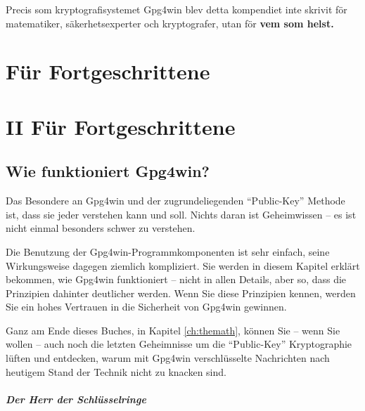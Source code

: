 \documentclass[a4paper,11pt, oneside,openright,titlepage,dvips]{scrbook}
\newcounter{part}
\newcounter{chapter}
\newcounter{section}[chapter]
\begin{document}
Precis som kryptografisystemet Gpg4win blev detta kompendiet inte 
skrivit för matematiker, säkerhetsexperter och kryptografer, utan 
för \textbf{vem som helst.}









\clearpage
{}
\T\part{Für Fortgeschrittene}
\W\part*{\textbf{II Für Fortgeschrittene}}
\label{part:Fortgeschrittene}


\clearpage
\chapter{Wie funktioniert Gpg4win?}
\label{ch:FunctionOfGpg4win}

Das Besondere an Gpg4win und der zugrundeliegenden "`Public-Key"' Methode
ist, dass sie jeder verstehen kann und soll. Nichts daran ist
Geheimwissen ­-- es ist nicht einmal besonders schwer zu verstehen.

Die Benutzung der Gpg4win-Programmkomponenten ist sehr einfach, seine Wirkungsweise
dagegen ziemlich kompliziert. Sie werden in diesem Kapitel erklärt bekommen,
wie Gpg4win funktioniert ­-- nicht in allen Details, aber so, dass die Prinzipien
dahinter deutlicher werden. Wenn Sie diese Prinzipien kennen, werden
Sie ein hohes Vertrauen in die Sicherheit von Gpg4win gewinnen.

Ganz am Ende dieses Buches, in Kapitel \ref{ch:themath}, können Sie
­-- wenn Sie wollen ­-- auch noch die letzten Geheimnisse um die
"`Public-Key"' Kryptographie lüften und entdecken, warum mit Gpg4win
verschlüsselte Nachrichten nach heutigem Stand der Technik nicht zu
knacken sind.


\clearpage
\subsubsection{Der Herr der Schlüsselringe}
\end{document}

